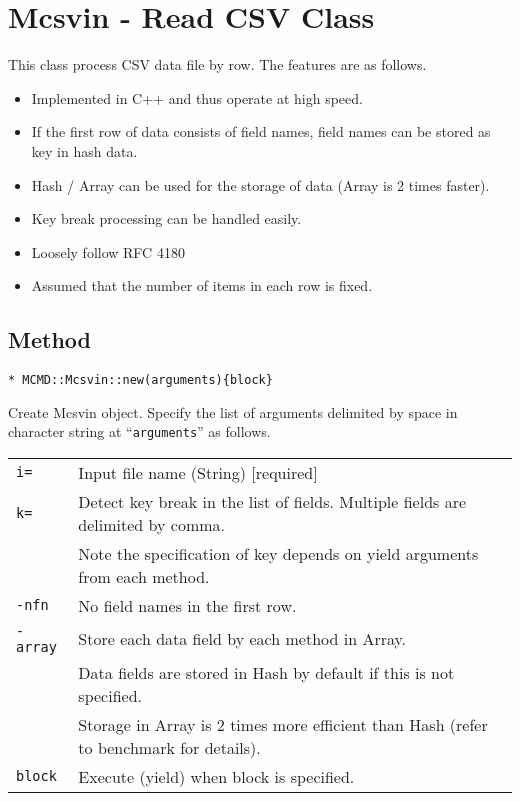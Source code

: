 
%

\section{Mcsvin - Read CSV Class \label{sect:mcsvinRB}}
This class process CSV data file by row. The features are as follows. 

\begin{itemize}
\item Implemented in C++ and thus operate at high speed.
\item If the first row of data consists of field names, field names can be stored as key in hash data.
\item Hash / Array can be used for the storage of data (Array is 2 times faster). 
\item Key break processing can be handled easily.
\item Loosely follow RFC 4180
\item Assumed that the number of items in each row is fixed.
\end{itemize} 

\subsection{Method}

{\Large
\begin{verbatim}
* MCMD::Mcsvin::new(arguments){block}
\end{verbatim}
}

Create Mcsvin object. Specify the list of arguments delimited by space in character string at “\verb|arguments|” as follows.  


\begin{table}[htbp]
\begin{tabular}{ll}
\verb|i=|    & Input file name (String)  [required]\\
\verb|k=|    & Detect key break in the list of fields. Multiple fields are delimited by comma. \\
             & Note the specification of key depends on yield arguments from each method. \\
\verb|-nfn|  & No field names in the first row. \\
\verb|-array|& Store each data field by each method in Array. \\
             & Data fields are stored in Hash by default if this is not specified.\\
             & Storage in Array is 2 times more efficient than Hash (refer to benchmark for details). \\
\verb|block| & Execute (yield) when block is specified. \\
\end{tabular} 
\end{table} 

